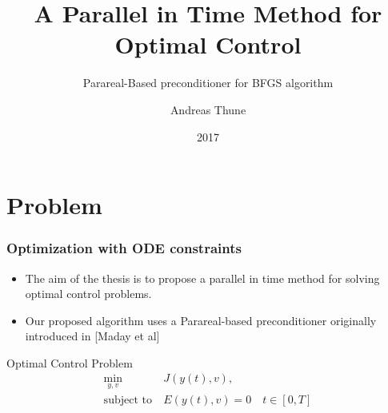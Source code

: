 \documentclass[9pt]{beamer}
\title{A Parallel in Time Method for Optimal Control}
\subtitle{Parareal-Based preconditioner for BFGS algorithm}
\author{Andreas Thune}
\date{2017}
\begin{document}
 
\frame{\titlepage}
\section{Problem}

\begin{frame}
\frametitle{Optimization with ODE constraints}
\begin{itemize}
\item{The aim of the thesis is to propose a parallel in time method for solving optimal control problems.}
\item{Our proposed algorithm uses a Parareal-based preconditioner originally introduced in [Maday et al] }
\end{itemize}
\begin{block}{Optimal Control Problem}
\begin{align*}
\min_{y,v} &J(y(t),v), \\
\textrm{subject to} \ &E(y(t),v)=0\quad t\in[0,T]
\end{align*}
\end{block}
\end{frame}
\end{document}
